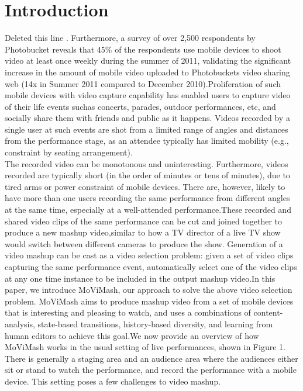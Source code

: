 \documentclass{sig-alternate}
\begin{document}
\section{Introduction}
Deleted this line \cite{web:1}. Furthermore, a survey of over 2,500 respondents by Photobucket reveals that 45\% of the \cite{web:2} respondents use mobile devices to shoot video at least once weekly during the summer of 2011, validating the significant increase in the amount of mobile video uploaded to Photobucket\textquotesingle s video sharing web (14x in Summer 2011 compared to December 2010)\cite{web:3}.Proliferation of such mobile devices with video capture capability has enabled users to capture video of their life events suchas concerts, parades, outdoor performances, etc, and socially share them with friends and public as it happens. Videos recorded by a single user at such events are shot from a limited range of angles and distances from the performance stage, as an attendee typically has limited mobility (e.g., constraint by seating arrangement).\\
\qquad  The recorded video can be monotonous and uninteresting. Furthermore, videos recorded are typically short (in the order of minutes or tens of minutes), due to tired arms or power constraint of mobile devices. There are, however, likely to have more than one users
recording the same performance from different angles at the same time, especially at a well-attended performance.These recorded and shared video clips of the same performance
can be cut and joined together to produce a new mashup video,similar to how a TV director of a live TV show would switch between different cameras to produce the show. Generation of a video
mashup can be cast as a video selection problem: given a set of video clips capturing the same performance event, automatically select one of the video clips at any one time instance to be included in the output mashup video.In this paper, we introduce MoViMash, our approach to solve the above video selection problem. MoViMash aims to produce mashup video from a set of mobile devices that is interesting and pleasing to watch, and uses a combinations of content-analysis, state-based transitions, history-based diversity, and learning from
human editors to achieve this goal.We now provide an overview of how MoViMash works in the
usual setting of live performances, shown in Figure 1. There is generally a staging area and an audience area where the audiences either sit or stand to watch the performance, and record the performance with a mobile device. This setting poses a few challenges to video mashup.
\end{document}
